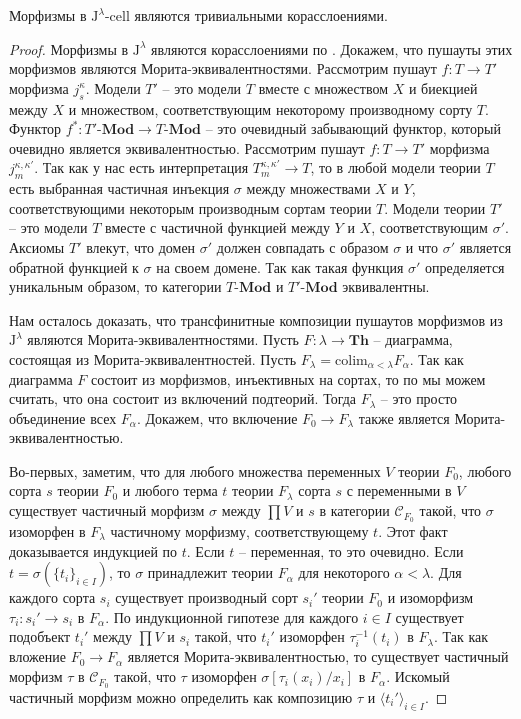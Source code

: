 \documentclass[reqno]{amsart}
\theoremstyle{definition}
\theoremstyle{remark}
\newcommand{\bcat}[1]{\mathbf{#1}}
\newcommand{\cat}[1]{\mathcal{#1}}
\newcommand{\Mod}[1]{#1\text{-}\bcat{Mod}}
\newcommand{\fs}[1]{\mathrm{#1}}
\newcommand{\Th}{\bcat{Th}}
\newcommand{\colim}{\fs{colim}}
\newcommand{\I}{\mathrm{I}}
\newcommand{\J}{\mathrm{J}}
\newcommand{\class}[2]{#1\text{-}\mathrm{#2}}
\newcommand{\Icell}[1][\I]{\class{#1}{cell}}
\begin{document}
\begin{lem}
Морфизмы в $\Icell[\J^\lambda]$ являются тривиальными корасслоениями.
\end{lem}
\begin{proof}
Морфизмы в $\J^\lambda$ являются корасслоениями по .
Докажем, что пушауты этих морфизмов являются Морита-эквивалентностями.
Рассмотрим пушаут $f : T \to T'$ морфизма $j^\kappa_s$.
Модели $T'$ -- это модели $T$ вместе с множеством $X$ и биекцией между $X$ и множеством, соответствующим некоторому производному сорту $T$.
Функтор $f^* : \Mod{T'} \to \Mod{T}$ -- это очевидный забывающий функтор, который очевидно является эквивалентностью.
Рассмотрим пушаут $f : T \to T'$ морфизма $j^{\kappa,\kappa'}_m$.
Так как у нас есть интерпретация $T_m^{\kappa,\kappa'} \to T$, то в любой модели теории $T$ есть выбранная частичная инъекция $\sigma$ между множествами $X$ и $Y$, соответствующими некоторым производным сортам теории $T$.
Модели теории $T'$ -- это модели $T$ вместе с частичной функцией между $Y$ и $X$, соответствующим $\sigma'$.
Аксиомы $T'$ влекут, что домен $\sigma'$ должен совпадать с образом $\sigma$ и что $\sigma'$ является обратной функцией к $\sigma$ на своем домене.
Так как такая функция $\sigma'$ определяется уникальным образом, то категории $\Mod{T}$ и $\Mod{T'}$ эквивалентны.

Нам осталось доказать, что трансфинитные композиции пушаутов морфизмов из $\J^\lambda$ являются Морита-эквивалентностями.
Пусть $F : \lambda \to \Th$ -- диаграмма, состоящая из Морита-эквивалентностей.
Пусть $F_\lambda = \colim_{\alpha < \lambda} F_\alpha$.
Так как диаграмма $F$ состоит из морфизмов, инъективных на сортах, то по  мы можем считать, что она состоит из включений подтеорий.
Тогда $F_\lambda$ -- это просто объединение всех $F_\alpha$.
Докажем, что включение $F_0 \to F_\lambda$ также является Морита-эквивалентностью.

Во-первых, заметим, что для любого множества переменных $V$ теории $F_0$, любого сорта $s$ теории $F_0$ и любого терма $t$ теории $F_\lambda$ сорта $s$ с переменными в $V$
существует частичный морфизм $\sigma$ между $\prod V$ и $s$ в категории $\cat{C}_{F_0}$ такой, что $\sigma$ изоморфен в $F_\lambda$ частичному морфизму, соответствующему $t$.
Этот факт доказывается индукцией по $t$.
Если $t$ -- переменная, то это очевидно.
Если $t = \sigma(\{ t_i \}_{i \in I})$, то $\sigma$ принадлежит теории $F_\alpha$ для некоторого $\alpha < \lambda$.
Для каждого сорта $s_i$ существует производный сорт $s_i'$ теории $F_0$ и изоморфизм $\tau_i : s_i' \to s_i$ в $F_\alpha$.
По индукционной гипотезе для каждого $i \in I$ существует подобъект $t_i'$ между $\prod V$ и $s_i$ такой, что $t_i'$ изоморфен $\tau_i^{-1}(t_i)$ в $F_\lambda$.
Так как вложение $F_0 \to F_\alpha$ является Морита-эквивалентностью, то существует частичный морфизм $\tau$ в $\cat{C}_{F_0}$ такой, что $\tau$ изоморфен $\sigma[\tau_i(x_i)/x_i]$ в $F_\alpha$.
Искомый частичный морфизм можно определить как композицию $\tau$ и $\langle t_i' \rangle_{i \in I}$.


\end{proof}
\end{document}
